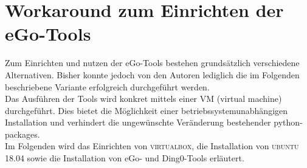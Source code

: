 \documentclass[
a4paper,     %
12pt         %
]{scrartcl}  %
\begin{document}
%
%
%
%
%
%
%
%
\newpage
\section{Workaround zum Einrichten der eGo-Tools}
Zum Einrichten und nutzen der eGo-Tools bestehen grundsätzlich verschiedene Alternativen. Bisher konnte jedoch von den Autoren lediglich die im Folgenden beschriebene Variante erfolgreich durchgeführt werden.\\
Das Ausführen der Tools wird konkret mittels einer VM (virtual machine) durchgeführt. Dies bietet die Möglichkeit einer betriebssystemunabhängigen Installation und verhindert die ungewünschte Veränderung bestehender python-packages.\\
Im Folgenden wird das Einrichten von \textsc{virtualbox}, die Installation von \textsc{ubuntu 18.04} sowie die Installation von eGo- und Ding0-Tools erläutert.
\end{document}
